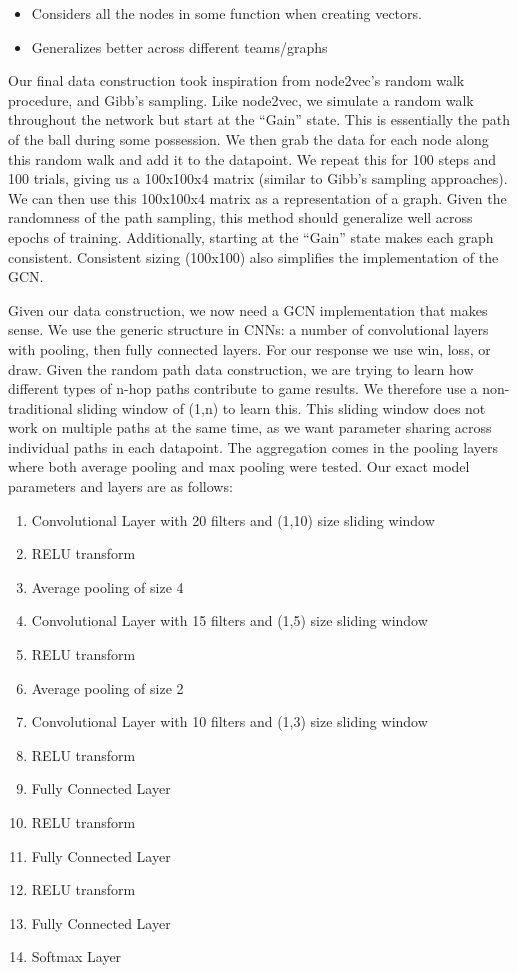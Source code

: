 \begin{itemize}
    \item Considers all the nodes in some function when creating vectors.

    \item Generalizes better across different teams/graphs 
\end{itemize}


Our final data construction took inspiration from node2vec’s random walk procedure, and Gibb’s sampling. Like node2vec, we simulate a random walk throughout the network but start at the “Gain” state. This is essentially the path of the ball during some possession.  We then grab the data for each node along this random walk and add it to the datapoint. We repeat this for 100 steps and 100 trials, giving us a 100x100x4 matrix (similar to Gibb’s sampling approaches). We can then use this 100x100x4 matrix as a representation of a graph. Given the randomness of the path sampling, this method should generalize well across epochs of training. Additionally, starting at the “Gain” state makes each graph consistent. Consistent sizing (100x100) also simplifies the implementation of the GCN. 

Given our data construction, we now need a GCN implementation that makes sense. We use the generic structure in CNNs: a number of convolutional layers with pooling, then fully connected layers. For our response we use win, loss, or draw. Given the random path data construction, we are trying to learn how different types of n-hop paths contribute to game results. We therefore use a non-traditional sliding window of (1,n) to learn this. This sliding window does not work on multiple paths at the same time, as we want parameter sharing across individual paths in each datapoint. The aggregation comes in the pooling layers where both average pooling and max pooling were tested. Our exact model parameters and layers are as follows: 

\begin{enumerate}
    \item Convolutional Layer with 20 filters and (1,10) size sliding window
    \item RELU transform
    \item Average pooling of size 4
    \item Convolutional Layer with 15 filters and (1,5) size sliding window
    \item RELU transform
    \item Average pooling of size 2
    \item Convolutional Layer with 10 filters and (1,3) size sliding window
    \item RELU transform
    \item Fully Connected Layer
    \item RELU transform
    \item Fully Connected Layer
    \item RELU transform
    \item Fully Connected Layer
    \item Softmax Layer
\end{enumerate}

